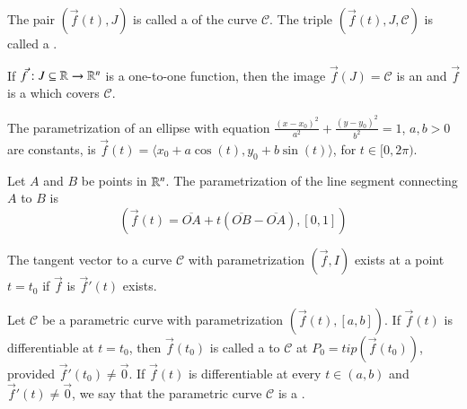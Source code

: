 \begin{appendices}
    \begin{rmk}
        The pair $(\vec{f}(t), J)$ is called a  of the curve $\mathscr{C}$. The triple $(\vec{f}(t), J, \mathscr{C})$ is called a .
    \end{rmk}

    \begin{defn}
        If $\vec{f}:J \subseteq \mathbb R\rightarrow \mathbb R^n$ is a one-to-one function, then the image $\vec{f}(J) = \mathscr{C}$ is an  and $\vec{f}$ is a  which covers $\mathscr{C}$.
    \end{defn}

    \begin{rmk}[Ellipse]
        The parametrization of an ellipse with equation $\frac{(x-x_0)^2}{a^2} + \frac{(y-y_0)^2}{b^2} = 1$, $a,b > 0$ are constants, is $\vec{f}(t) = \langle x_0 + a\cos(t), y_0 + b\sin(t)\rangle$, for $t \in [0,2\pi)$.
    \end{rmk}


    \begin{rmk}[Line]
        Let $A$ and $B$ be points in $\mathbb R^n$. The parametrization of the line segment connecting $A$ to $B$ is \begin{equation}
            (\vec{f}(t) = \overline{OA} + t(\overline{OB} - \overline{OA}), [0,1])
        \end{equation}
    \end{rmk}


    \begin{defn}
        The tangent vector to a curve $\mathscr{C}$ with parametrization $(\vec{f}, I)$ exists at a point $t = t_0$ if $\vec{f}$ is $\vec{f}'(t)$ exists.
    \end{defn}


    \begin{defn}
        Let $\mathscr{C}$ be a parametric curve with parametrization $(\vec{f}(t),[a,b])$. If $\vec{f}(t)$ is differentiable at $t = t_0$, then $\vec{f}(t_0)$ is called a  to $\mathscr{C}$ at $P_0 = tip(\vec{f}(t_0))$, provided $\vec{f}'(t_0) \neq \vec{0}$. If $\vec{f}(t)$ is differentiable at every $t \in (a,b)$ and $\vec{f}'(t) \neq \vec{0}$, we say that the parametric curve $\mathscr{C}$ is a .
    \end{defn}
    


\end{appendices}
